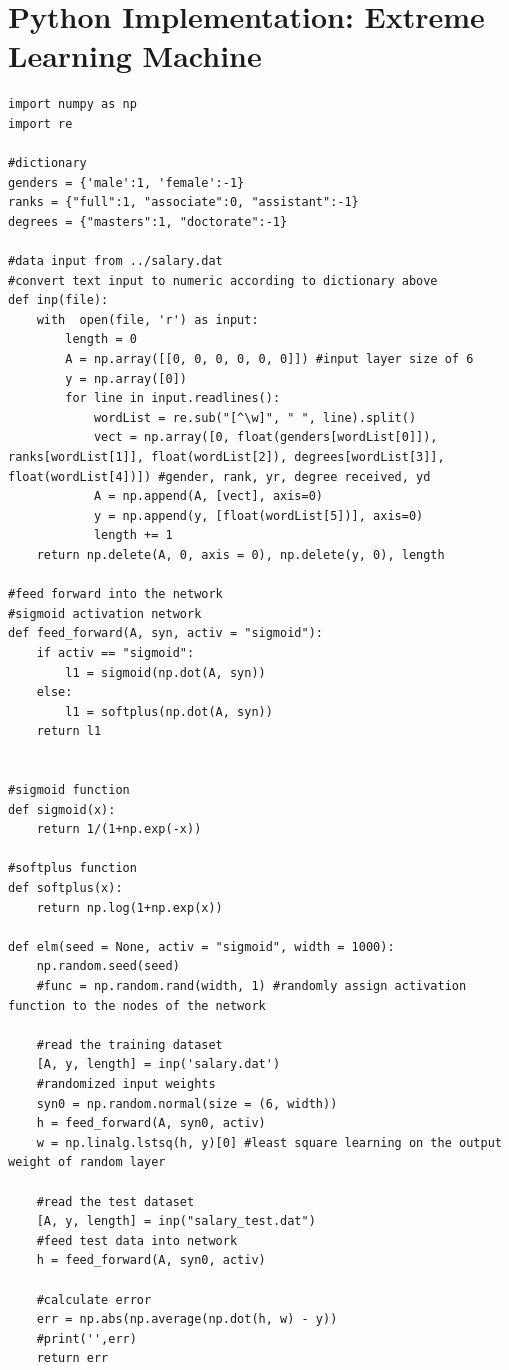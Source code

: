 \documentclass[13pt]{article}
\begin{document}
\section{Python Implementation: Extreme Learning Machine}
\begin{verbatim}
import numpy as np
import re

#dictionary
genders = {'male':1, 'female':-1}
ranks = {"full":1, "associate":0, "assistant":-1}
degrees = {"masters":1, "doctorate":-1}

#data input from ../salary.dat
#convert text input to numeric according to dictionary above
def inp(file):
    with  open(file, 'r') as input:
        length = 0
        A = np.array([[0, 0, 0, 0, 0, 0]]) #input layer size of 6
        y = np.array([0])
        for line in input.readlines():
            wordList = re.sub("[^\w]", " ", line).split()
            vect = np.array([0, float(genders[wordList[0]]), ranks[wordList[1]], float(wordList[2]), degrees[wordList[3]], float(wordList[4])]) #gender, rank, yr, degree received, yd
            A = np.append(A, [vect], axis=0)
            y = np.append(y, [float(wordList[5])], axis=0)
            length += 1
    return np.delete(A, 0, axis = 0), np.delete(y, 0), length

#feed forward into the network
#sigmoid activation network
def feed_forward(A, syn, activ = "sigmoid"):
    if activ == "sigmoid":
        l1 = sigmoid(np.dot(A, syn))
    else:
        l1 = softplus(np.dot(A, syn))
    return l1


#sigmoid function
def sigmoid(x):
    return 1/(1+np.exp(-x))

#softplus function
def softplus(x):
    return np.log(1+np.exp(x))

def elm(seed = None, activ = "sigmoid", width = 1000):
    np.random.seed(seed)
    #func = np.random.rand(width, 1) #randomly assign activation function to the nodes of the network

    #read the training dataset
    [A, y, length] = inp('salary.dat')
    #randomized input weights
    syn0 = np.random.normal(size = (6, width))
    h = feed_forward(A, syn0, activ)
    w = np.linalg.lstsq(h, y)[0] #least square learning on the output weight of random layer

    #read the test dataset
    [A, y, length] = inp("salary_test.dat")
    #feed test data into network
    h = feed_forward(A, syn0, activ)

    #calculate error
    err = np.abs(np.average(np.dot(h, w) - y))
    #print('',err)
    return err
\end{verbatim}
\end{document}
